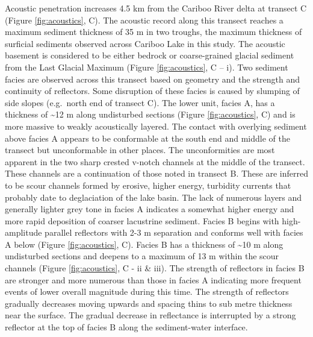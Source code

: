\documentclass[Royal,times,doublespace,sageh]{sagej}
\begin{document}
Acoustic penetration increases 4.5 km from the Cariboo River delta at
transect C (Figure \ref{fig:acoustics}, C). The acoustic record along
this transect reaches a maximum sediment thickness of 35 m in two
troughs, the maximum thickness of surficial sediments observed across
Cariboo Lake in this study. The acoustic basement is considered to be
either bedrock or coarse-grained glacial sediment from the Last Glacial
Maximum (Figure \ref{fig:acoustics}, C -- i). Two sediment facies are
observed across this transect based on geometry and the strength and
continuity of reflectors. Some disruption of these facies is caused by
slumping of side slopes (e.g.~north end of transect C). The lower unit,
facies A, has a thickness of \textasciitilde12 m along undisturbed
sections (Figure \ref{fig:acoustics}, C) and is more massive to weakly
acoustically layered. The contact with overlying sediment above facies A
appears to be conformable at the south end and middle of the transect
but unconformable in other places. The unconformities are most apparent
in the two sharp crested v-notch channels at the middle of the transect.
These channels are a continuation of those noted in transect B. These
are inferred to be scour channels formed by erosive, higher energy,
turbidity currents that probably date to deglaciation of the lake basin.
The lack of numerous layers and generally lighter grey tone in facies A
indicates a somewhat higher energy and more rapid deposition of coarser
lacustrine sediment. Facies B begins with high-amplitude parallel
reflectors with 2-3 m separation and conforms well with facies A below
(Figure \ref{fig:acoustics}, C). Facies B has a thickness of
\textasciitilde10 m along undisturbed sections and deepens to a maximum
of 13 m within the scour channels (Figure \ref{fig:acoustics}, C - ii \&
iii). The strength of reflectors in facies B are stronger and more
numerous than those in facies A indicating more frequent events of lower
overall magnitude during this time. The strength of reflectors gradually
decreases moving upwards and spacing thins to sub metre thickness near
the surface. The gradual decrease in reflectance is interrupted by a
strong reflector at the top of facies B along the sediment-water
interface.
\end{document}
